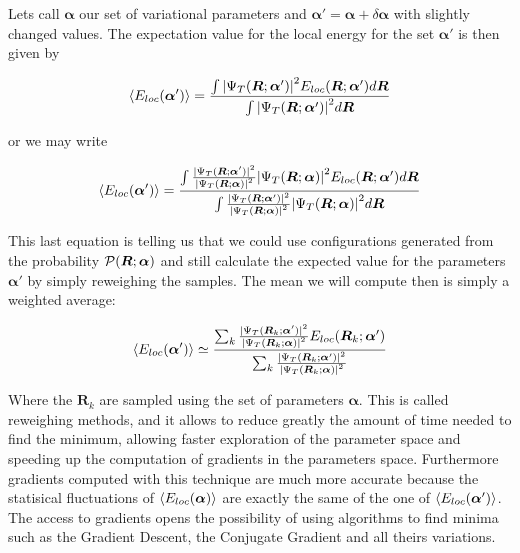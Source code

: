 Lets call $\bm{\alpha}$ our set of variational parameters and $\bm{\alpha}'=\bm{\alpha} +\delta\bm{\alpha}$ with slightly changed values.
The expectation value for the local energy for the set $\bm{\alpha}'$ is then given by

\begin{equation}
  \langle E_{loc}(\bm{\alpha}') \rangle=\dfrac{\int {| \Psi_T(\bm{R};\bm{\alpha}') |}^2E_{loc}(\bm{R};\bm{\alpha}')d\bm{R}}{\int {| \Psi_T(\bm{R};\bm{\alpha}') |}^2d\bm{R}}
\end{equation}

or we may write

\begin{equation}
  \langle E_{loc}(\bm{\alpha}') \rangle=\dfrac{\int \frac{{| \Psi_T(\bm{R};\bm{\alpha}') |}^2}{{| \Psi_T(\bm{R};\bm{\alpha}) |}^2}{| \Psi_T(\bm{R};\bm{\alpha}) |}^2E_{loc}(\bm{R};\bm{\alpha}')d\bm{R}}{\int \frac{{| \Psi_T(\bm{R};\bm{\alpha}') |}^2}{{| \Psi_T(\bm{R};\bm{\alpha}) |}^2}{| \Psi_T(\bm{R};\bm{\alpha}) |}^2d\bm{R}}
\end{equation}

This last equation is telling us that we could use configurations generated from the probability $\mathcal{P}(\bm{R};\bm{\alpha})$ and still calculate the expected value for the parameters $\bm{\alpha}'$ by simply reweighing the samples.
The mean we will compute then is simply a weighted average\cite{Pederiva2017}:

\begin{equation}
  \langle E_{loc}(\bm{\alpha}') \rangle\simeq\dfrac{\sum_k\frac{{| \Psi_T(\bm{R}_k;\bm{\alpha}') |}^2}{{| \Psi_T(\bm{R}_k;\bm{\alpha}) |}^2}E_{loc}(\bm{R}_k;\bm{\alpha}')}{\sum_k\frac{{| \Psi_T(\bm{R}_k;\bm{\alpha}') |}^2}{{| \Psi_T(\bm{R}_k;\bm{\alpha}) |}^2}}
\end{equation}

Where the $\bm{R}_k$ are sampled using the set of parameters $\bm{\alpha}$.
This is called reweighing methods, and it allows to reduce greatly the amount of time needed to find the minimum, allowing faster exploration of the parameter space and speeding up the computation of gradients in the parameters space.
Furthermore gradients computed with this technique are much more accurate because the statisical fluctuations of $\langle E_{loc}(\bm{\alpha}) \rangle$ are exactly the same of the one of $\langle E_{loc}(\bm{\alpha}') \rangle$.
The access to gradients opens the possibility of using algorithms to find minima such as the Gradient Descent, the Conjugate Gradient and all theirs variations.

